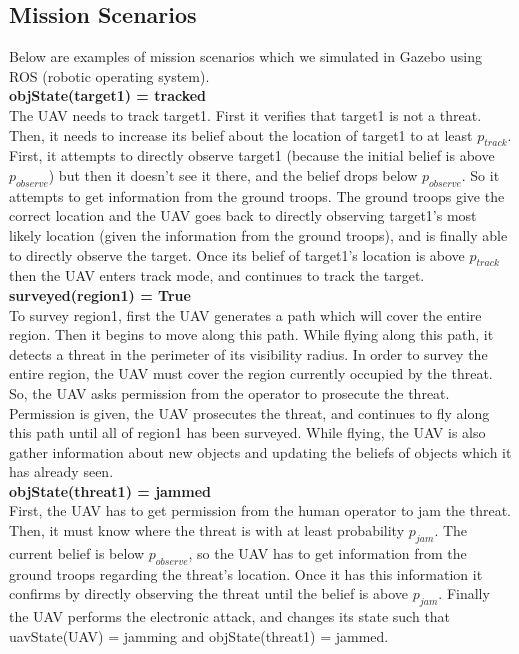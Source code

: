 \documentclass[12pt]{article}
\begin{document}
\subsection{Mission Scenarios}

Below are examples of mission scenarios which we simulated in Gazebo using ROS (robotic operating system). \\

\noindent
\textbf{objState(target1) = tracked} \\
The UAV needs to track target1. First it verifies that target1 is not a threat. Then, it needs to increase its belief about the location of target1 to at least $p_{track}$. First, it attempts to directly observe target1 (because the initial belief is above $p_{observe}$) but then it doesn't see it there, and the belief drops below $p_{observe}$. So it attempts to get information from the ground troops. The ground troops give the correct location and the UAV goes back to directly observing target1's most likely location (given the information from the ground troops), and is finally able to directly observe the target. Once its belief of target1's location is above $p_{track}$ then the UAV enters track mode, and continues to track the target. \\

\noindent
\textbf{surveyed(region1) = True} \\
To survey region1, first the UAV generates a path which will cover the entire region. Then it begins to move along this path. While flying along this path, it detects a threat in the perimeter of its visibility radius. In order to survey the entire region, the UAV must cover the region currently occupied by the threat. So, the UAV asks permission from the operator to prosecute the threat. Permission is given, the UAV prosecutes the threat, and continues to fly along this path until all of region1 has been surveyed. While flying, the UAV is also gather information about new objects and updating the beliefs of objects which it has already seen. \\

\noindent
\textbf{objState(threat1) = jammed} \\
First, the UAV has to get permission from the human operator to jam the threat. Then, it must know where the threat is with at least probability $p_{jam}$. The current belief is below $p_{observe}$, so the UAV has to get information from the ground troops regarding the threat's location. Once it has this information it confirms by directly observing the threat until the belief is above $p_{jam}$. Finally the UAV performs the electronic attack, and changes its state such that uavState(UAV) = jamming and objState(threat1) = jammed. \\
\end{document}
